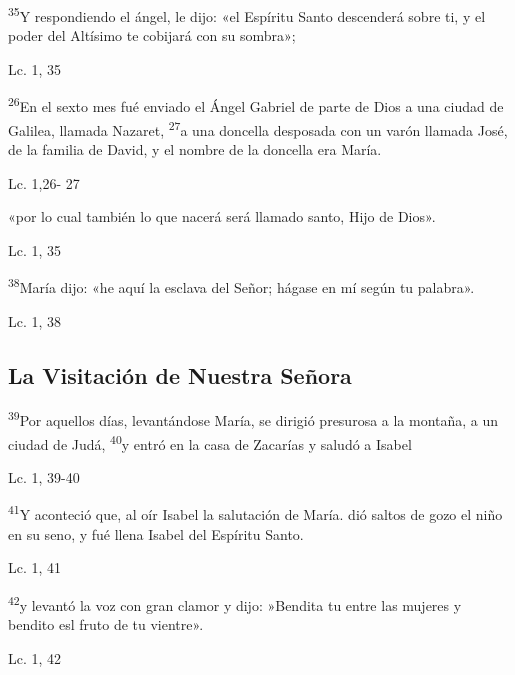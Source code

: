 \documentclass[a4paper,11pt]{article}
\begin{document}
      \textsuperscript{35}Y respondiendo el ángel, le dijo: «el Espíritu Santo descenderá sobre ti, y el poder del Altísimo te cobijará con su sombra»;
      \begin{flushright}
        Lc. 1, 35
      \end{flushright}
      
      \textsuperscript{26}En el sexto mes fué enviado el Ángel Gabriel de parte de Dios a una ciudad de Galilea, llamada Nazaret, \textsuperscript{27}a una 
      doncella desposada con un varón llamada José, de la familia de David, y el nombre de la doncella era María.
      \begin{flushright}
        Lc. 1,26- 27
      \end{flushright}

      «por lo cual también lo que nacerá será llamado santo, Hijo de Dios».
      \begin{flushright}
        Lc. 1, 35
      \end{flushright}

      \textsuperscript{38}María dijo: «he aquí la esclava del Señor; hágase en mí según tu palabra».
      \begin{flushright}
        Lc. 1, 38
      \end{flushright}
            
    \subsection*{\hfil La Visitación de Nuestra Señora \hfil}
      
      \textsuperscript{39}Por aquellos días, levantándose María, se dirigió presurosa a la montaña, a un ciudad de Judá, \textsuperscript{40}y entró en la casa
      de Zacarías y saludó a Isabel
      \begin{flushright}
        Lc. 1, 39-40        
      \end{flushright}
      
      \textsuperscript{41}Y aconteció que, al oír Isabel la salutación de María. dió saltos de gozo el niño en su seno, y fué llena Isabel del Espíritu Santo.
      \begin{flushright}
        Lc. 1, 41        
      \end{flushright}
      
      \textsuperscript{42}y levantó la voz con gran clamor y dijo: »Bendita tu entre las mujeres y bendito esl fruto de tu vientre».
      \begin{flushright}
        Lc. 1, 42         
      \end{flushright}
      
\end{document}
